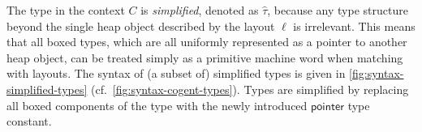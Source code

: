 

The type in the context $C$ is \emph{simplified}, denoted as $\hat{\tau}$,
because any type structure beyond the single heap object described by the
layout $\ell$ is irrelevant. This means that all boxed types, which are all
uniformly represented as a pointer to another heap object, can be treated
simply as a primitive machine word when matching with layouts. The syntax of (a
subset of) simplified types is given in \autoref{fig:syntax-simplified-types}
(cf.\ \autoref{fig:syntax-cogent-types}). Types are simplified by
replacing all boxed components of the type with the newly introduced
$\mathsf{pointer}$ type constant.  

%
%
%
%




